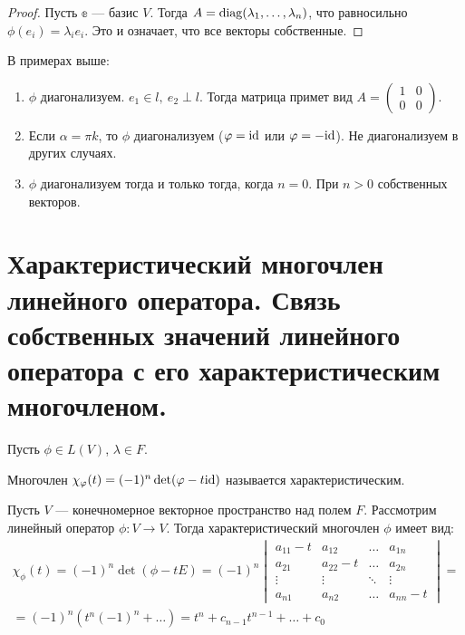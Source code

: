 \begin{proof}
    Пусть $\mathbb{e}$ --- базис $V$. Тогда $A = \mathrm{diag}(\lambda_1, \ldots, \lambda_n)$, что равносильно $\phi(e_i) = \lambda_i e_i$. Это и означает, что все векторы собственные.
\end{proof}
В примерах выше:
\begin{enumerate}
    \item $\phi$ диагонализуем. $e_1 \in l,\ e_2 \perp l$. Тогда матрица примет вид $A = \begin{pmatrix}
        1 &0 \\
        0 &0
    \end{pmatrix}$.
    \item Если $\alpha = \pi k$, то $\phi$ диагонализуем ($\varphi = \mathrm{id}$ или $\varphi = - \mathrm{id}$). Не диагонализуем в других случаях.
    \item $\phi$ диагонализуем тогда и только тогда, когда $n = 0$. При $n > 0$ собственных векторов.
\end{enumerate}

\section{Характеристический многочлен линейного оператора. Связь собственных значений линейного оператора с его характеристическим многочленом.}

Пусть $\phi\in L(V)$, $\lambda\in F$. 

\begin{Def}
    Многочлен $\chi_{\varphi}(t) = (-1)^n\det(\varphi - t \mathrm{id})$ называется характеристическим.
\end{Def}

\begin{Def}
	Пусть $V$ --- конечномерное векторное пространство над полем $F$. Рассмотрим линейный оператор $\phi: V \to V$. Тогда характеристический многочлен $\phi$ имеет вид:
	\begin{gather*}
	\chi_{\phi}(t) = (-1)^n\det(\phi - tE) = (-1)^n
  \begin{vmatrix}
  a_{11} - t & a_{12} &\ldots &a_{1n}\\
  a_{21} & a_{22} - t &\ldots &a_{2n} \\
  \vdots &\vdots &\ddots &\vdots\\
  a_{n1} &a_{n2} &\ldots & a_{nn} - t
  \end{vmatrix}
  = \\ 
  = (-1)^n(t^n(-1)^n + \ldots)  = t^n + c_{n-1}t^{n-1} + \ldots + c_0
  \end{gather*}
\end{Def}

